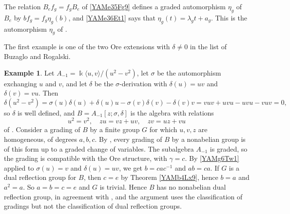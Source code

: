 \documentclass[reqno]{amsart}
\numberwithin{equation}{section}
\theoremstyle{definition}
\newtheorem{example}[equation]{Example}
\theoremstyle{remark}
\theoremstyle{plain}
\newcommand{\kk}{\Bbbk}
\begin{document}
The relation $B_ef_g=f_gB_e$ of \eqref{YAMe35Fg9} defines a graded automorphism $\eta_g$ of $B_e$ by $bf_g=f_g\eta_g(b)$, and \eqref{YAMe36Et1} says that $\eta_g(t)=\lambda_gt+a_g$. This is the automorphism $\eta_g$ of \cite[(E3.5.1)]{KKZ}.

The first example is one of the two Ore extensions with $\delta\neq0$ in the list of Buzaglo and Rogalski.

\begin{example}\label{YAMx7Lp1}
Let $A_{-1}=\kk\langle u,v\rangle/(u^2-v^2)$, let $\sigma$ be the automorphism exchanging $u$ and $v$, and let $\delta$ be the $\sigma$-derivation with $\delta(u)=uv$ and $\delta(v)=vu$. Then
\[
\delta(u^2-v^2)=\sigma(u)\delta(u)+\delta(u)u-\sigma(v)\delta(v)-\delta(v)v=vuv+uvu-uvu-vuv=0,
\]
so $\delta$ is well defined, and $B=A_{-1}[z;\sigma,\delta]$ is the algebra with relations
\[
u^2=v^2,\quad zu=vz+uv,\quad zv=uz+vu
\]
of \cite[Table 1]{BR}. Consider a grading of $B$ by a finite group $G$ for which $u,v,z$ are homogeneous, of degrees $a,b,c$. By \cite[Theorem 3.4]{BR}, every grading of $B$ by a nonabelian group is of this form up to a graded change of variables. The subalgebra $A_{-1}$ is graded, so the grading is compatible with the Ore structure, with $\gamma=c$. By \eqref{YAMg6Tw1} applied to $\sigma(u)=v$ and $\delta(u)=uv$, we get $b=cac^{-1}$ and $ab=ca$. If $G$ is a dual reflection group for $B$, then $c=e$ by Theorem \ref{YAMb4Lx9}, hence $b=a$ and $a^2=a$. So $a=b=c=e$ and $G$ is trivial. Hence $B$ has no nonabelian dual reflection group, in agreement with \cite[Theorem 1.2]{BR}, and the argument uses the classification of gradings \cite[Theorem 3.4]{BR} but not the classification of dual reflection groups.


\end{example}
\end{document}
